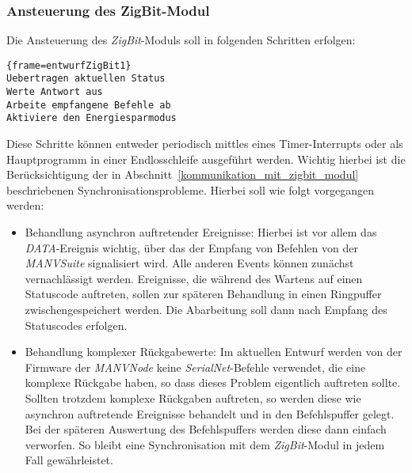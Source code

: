 \subsubsection{Ansteuerung des ZigBit-Modul}
Die Ansteuerung des \emph{ZigBit}-Moduls soll in folgenden Schritten erfolgen: 

\begin{lstlisting}{frame=entwurfZigBit1}
Uebertragen aktuellen Status
Werte Antwort aus
Arbeite empfangene Befehle ab
Aktiviere den Energiesparmodus
\end{lstlisting}

Diese Schritte können entweder periodisch mittles eines Timer-Interrupts oder als Hauptprogramm in einer Endlosschleife
ausgeführt werden. Wichtig hierbei ist die Berücksichtigung der in Abschnitt~\ref{kommunikation_mit_zigbit_modul}
beschriebenen Synchronisationsprobleme. Hierbei soll wie folgt vorgegangen werden:

\begin{itemize}
    \item{Behandlung asynchron auftretender Ereignisse:} Hierbei ist vor allem das \emph{DATA}-Ereignis wichtig, über das
    der Empfang von Befehlen von der \emph{MANVSuite} signalisiert wird. Alle anderen Events können zunächst vernachlässigt
    werden. Ereignisse, die während des Wartens auf einen Statuscode auftreten, sollen zur späteren Behandlung in einen
    Ringpuffer zwischengespeichert werden. Die Abarbeitung soll dann nach Empfang des Statuscodes erfolgen.

    \item{Behandlung komplexer Rückgabewerte:} Im aktuellen Entwurf werden von der Firmware der \emph{MANVNode} keine 
    \emph{SerialNet}-Befehle verwendet, die eine komplexe Rückgabe haben, so dass dieses Problem eigentlich auftreten 
    sollte. Sollten trotzdem komplexe Rückgaben auftreten, so werden diese wie asynchron auftretende Ereignisse behandelt
    und in den Befehlspuffer gelegt. Bei der späteren Auswertung des Befehlspuffers werden diese dann einfach verworfen.
    So bleibt eine Synchronisation mit dem \emph{ZigBit}-Modul in jedem Fall gewährleistet.
\end{itemize}

